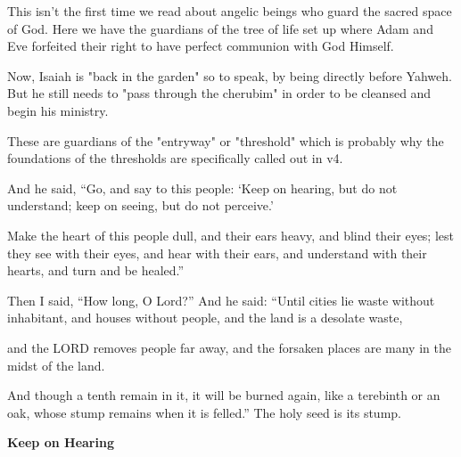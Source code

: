 \documentclass[11pt]{article}
\begin{document}
{\vspace{2em}}

This isn't the first time we read about angelic beings who guard the sacred space of God. Here we have the guardians of the tree of life set up where Adam and Eve forfeited their right to have perfect communion with God Himself.

Now, Isaiah is "back in the garden" so to speak, by being directly before Yahweh. But he still needs to "pass through the cherubim" in order to be cleansed and begin his ministry.

These are guardians of the "entryway" or "threshold" which is probably why the foundations of the thresholds are specifically called out in v4.


\newpage
\begin{biblicaloutline}[Isaiah 6:9-13]
    

    \begin{versesection}{2em}
         And he said, ``Go, and say to this people: `Keep on hearing, but do not understand; keep on seeing, but do not perceive.'

         Make the heart of this people dull, and their ears heavy, and blind their eyes; lest they see with their eyes, and hear with their ears, and understand with their hearts, and turn and be healed.''
    \end{versesection}
    
    
    \begin{versesection}{2em}
         Then I said, ``How long, O Lord?'' And he said: ``Until cities lie waste without inhabitant, and houses without people, and the land is a desolate waste,

         and the LORD removes people far away, and the forsaken places are many in the midst of the land.

         And though a tenth remain in it, it will be burned again, like a terebinth or an oak, whose stump remains when it is felled.'' The holy seed is its stump.
    \end{versesection}

\end{biblicaloutline}
\newpage

{\large\bfseries Keep on Hearing}
\end{document}
